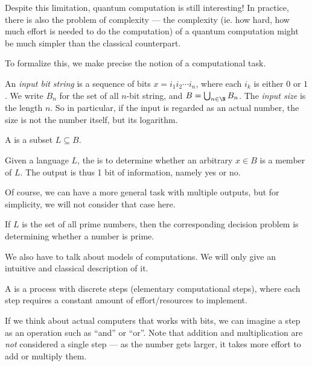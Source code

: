 \documentclass[a4paper]{article}
\begin{document}
Despite this limitation, quantum computation is still interesting! In practice, there is also the problem of complexity --- the complexity (ie. how hard, how much effort is needed to do the computation) of a quantum computation might be much simpler than the classical counterpart.

To formalize this, we make precise the notion of a computational task.

\begin{defi}
  An \emph{input bit string} is a sequence of bits $x = i_1i_2 \cdots i_n$, where each $i_k$ is either $0$ or $1$. We write $B_n$ for the set of all $n$-bit string, and $B = \bigcup_{n \in \N} B_n$. The \emph{input size} is the length $n$. So in particular, if the input is regarded as an actual number, the size is not the number itself, but its logarithm.
\end{defi}

\begin{defi}[Language]
  A  is a subset $L\subseteq B$.
\end{defi}

\begin{defi}
  Given a language $L$, the  is to determine whether an arbitrary $x \in B$ is a member of $L$. The output is thus 1 bit of information, namely yes or no.
\end{defi}
Of course, we can have a more general task with multiple outputs, but for simplicity, we will not consider that case here.

\begin{eg}
  If $L$ is the set of all prime numbers, then the corresponding decision problem is determining whether a number is prime.
\end{eg}

We also have to talk about models of computations. We will only give an intuitive and classical description of it.
\begin{defi}
  A  is a process with discrete steps (elementary computational steps), where each step requires a constant amount of effort/resources to implement.
\end{defi}
If we think about actual computers that works with bits, we can imagine a step as an operation such as ``and'' or ``or''. Note that addition and multiplication are \emph{not} considered a single step --- as the number gets larger, it takes more effort to add or multiply them.
\end{document}

